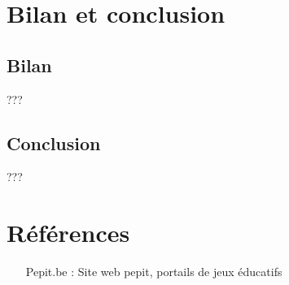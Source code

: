 \documentclass[french]{report}
\begin{document}
\chapter*{Bilan et conclusion}
\section*{Bilan}
???
\section*{Conclusion}
???

\appendix 
\chapter{Références}

\begin{itemize}
\item[Pepit.be :] Site web pepit, portails de jeux éducatifs
\end{itemize}
\end{document}
